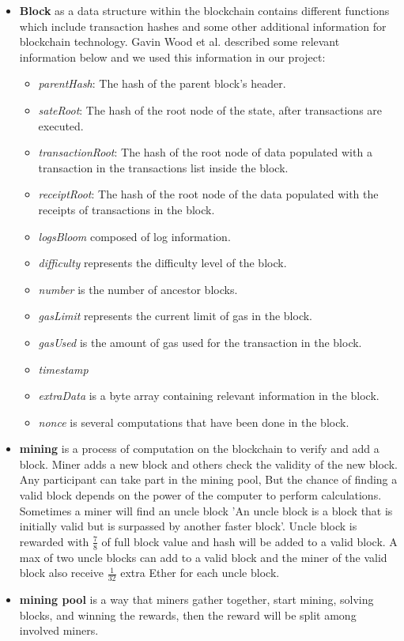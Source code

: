 \begin{itemize}
    \item \textbf{Block} as a data structure within the blockchain contains different functions which include transaction hashes and some other additional information for blockchain technology. Gavin Wood et al. \cite{Gavin} described some relevant information below and we used this information in our project: \\
    \begin{itemize}
        \item \textit{parentHash}: The hash of the parent block’s header.
        \item \textit{sateRoot}: The hash of the root node of the state, after transactions are executed.
        \item \textit{transactionRoot}: The hash of the root node of data populated with a transaction in the transactions list inside the block.
        \item \textit{receiptRoot}: The hash of the root node of the data populated with the receipts of transactions in the block.
        \item \textit{logsBloom} composed of log information.
        \item \textit{difficulty} represents the difficulty level of the block.
        \item \textit{number} is the number of ancestor blocks.
        \item \textit{gasLimit} represents the current limit of gas in the block.
        \item \textit{gasUsed} is the amount of gas used for the transaction in the block.
        \item \textit{timestamp}
        \item \textit{extraData} is a byte array containing relevant information in the block.
        \item \textit{nonce} is several computations that have been done in the block.
    \end{itemize}
    \item \textbf{mining} is a process of computation on the blockchain to verify and add a block. Miner adds a new block and others check the validity of the new block. Any participant can take part in the mining pool, But the chance of finding a valid block depends on the power of the computer to perform calculations. Sometimes a miner will find an uncle block 'An uncle block is a block that is initially valid but is surpassed by another faster block'. Uncle block is rewarded with $\frac{7}{8}$ of full block value and hash will be added to a valid block. A max of two uncle blocks can add to a valid block and the miner of the valid block also receive $\frac{1}{32}$ extra Ether for each uncle block\cite{Egbertsen}.
    \item \textbf{mining pool} is a way that miners gather together, start mining, solving blocks, and winning the rewards, then the reward will be split among involved miners\cite{Egbertsen}.
\end{itemize}
